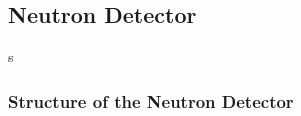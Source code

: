 \subsection{Neutron Detector}
%
\label{sec:expsetup_neutron}
  s

\subsubsection{Structure of the Neutron Detector}

